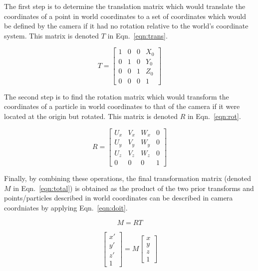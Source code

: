 \documentclass{article}
\begin{document}
The first step is to determine the translation matrix which would translate the coordinates of a point in world
coordinates to a set of coordinates which would be defined by the camera if it had no rotation relative to the world's
coordinate system. This matrix is denoted $T$ in Eqn.~\ref{eqn:trans}. 

\begin{equation}
T=
  \begin{bmatrix}
   1 & 0 & 0 & X_0 \\
   0 & 1 & 0 & Y_0 \\
   0 & 0 & 1 & Z_0 \\
   0 & 0 & 0 & 1
  \end{bmatrix}
  \label{eqn:trans}
\end{equation}


The second step is to find the rotation matrix 
which would transform the coordinates of a particle in world coordinates to that of the camera if it were located at 
the origin but rotated. This matrix is denoted $R$ in Eqn.~\ref{eqn:rot}.

\begin{equation}
R=
  \begin{bmatrix}
   U_x & V_x & W_x & 0 \\
   U_y & V_y & W_y & 0 \\
   U_z & V_z & W_z & 0 \\
   0 & 0 & 0 & 1
  \end{bmatrix}
  \label{eqn:rot}
\end{equation}

Finally, by combining these operations, the
final transformation matrix (denoted $M$ in Eqn.~\ref{eqn:total}) is obtained as the product of the two prior transforms
and points/particles described in world coordinates can be described in camera coordniates by applying Eqn.~\ref{eqn:doit}.

\begin{equation}
M = RT
\label{eqn:total}
\end{equation}

\begin{equation}
\begin{bmatrix}
  x' \\
  y' \\
  z' \\
  1
\end{bmatrix}
  = M
\begin{bmatrix}
  x \\
  y \\
  z \\
  1
\end{bmatrix}
\label{eqn:doit}
\end{equation}
\end{document}
